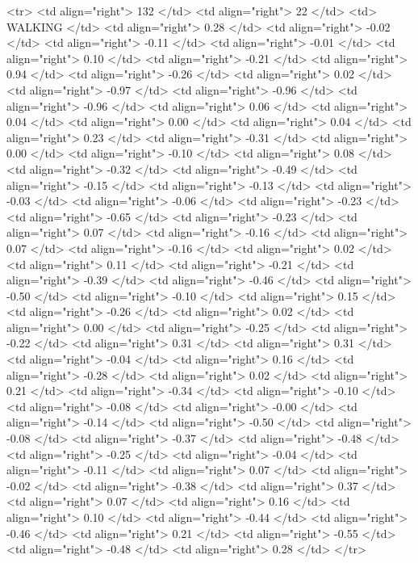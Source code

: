   <tr> <td align="right"> 132 </td> <td align="right">  22 </td> <td> WALKING </td> <td align="right"> 0.28 </td> <td align="right"> -0.02 </td> <td align="right"> -0.11 </td> <td align="right"> -0.01 </td> <td align="right"> 0.10 </td> <td align="right"> -0.21 </td> <td align="right"> 0.94 </td> <td align="right"> -0.26 </td> <td align="right"> 0.02 </td> <td align="right"> -0.97 </td> <td align="right"> -0.96 </td> <td align="right"> -0.96 </td> <td align="right"> 0.06 </td> <td align="right"> 0.04 </td> <td align="right"> 0.00 </td> <td align="right"> 0.04 </td> <td align="right"> 0.23 </td> <td align="right"> -0.31 </td> <td align="right"> 0.00 </td> <td align="right"> -0.10 </td> <td align="right"> 0.08 </td> <td align="right"> -0.32 </td> <td align="right"> -0.49 </td> <td align="right"> -0.15 </td> <td align="right"> -0.13 </td> <td align="right"> -0.03 </td> <td align="right"> -0.06 </td> <td align="right"> -0.23 </td> <td align="right"> -0.65 </td> <td align="right"> -0.23 </td> <td align="right"> 0.07 </td> <td align="right"> -0.16 </td> <td align="right"> 0.07 </td> <td align="right"> -0.16 </td> <td align="right"> 0.02 </td> <td align="right"> 0.11 </td> <td align="right"> -0.21 </td> <td align="right"> -0.39 </td> <td align="right"> -0.46 </td> <td align="right"> -0.50 </td> <td align="right"> -0.10 </td> <td align="right"> 0.15 </td> <td align="right"> -0.26 </td> <td align="right"> 0.02 </td> <td align="right"> 0.00 </td> <td align="right"> -0.25 </td> <td align="right"> -0.22 </td> <td align="right"> 0.31 </td> <td align="right"> 0.31 </td> <td align="right"> -0.04 </td> <td align="right"> 0.16 </td> <td align="right"> -0.28 </td> <td align="right"> 0.02 </td> <td align="right"> 0.21 </td> <td align="right"> -0.34 </td> <td align="right"> -0.10 </td> <td align="right"> -0.08 </td> <td align="right"> -0.00 </td> <td align="right"> -0.14 </td> <td align="right"> -0.50 </td> <td align="right"> -0.08 </td> <td align="right"> -0.37 </td> <td align="right"> -0.48 </td> <td align="right"> -0.25 </td> <td align="right"> -0.04 </td> <td align="right"> -0.11 </td> <td align="right"> 0.07 </td> <td align="right"> -0.02 </td> <td align="right"> -0.38 </td> <td align="right"> 0.37 </td> <td align="right"> 0.07 </td> <td align="right"> 0.16 </td> <td align="right"> 0.10 </td> <td align="right"> -0.44 </td> <td align="right"> -0.46 </td> <td align="right"> 0.21 </td> <td align="right"> -0.55 </td> <td align="right"> -0.48 </td> <td align="right"> 0.28 </td> </tr>
